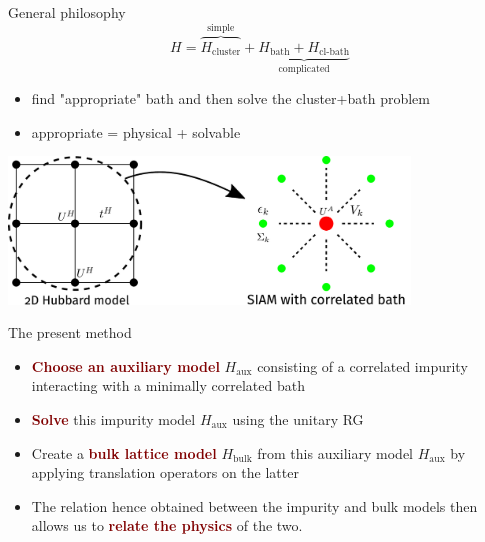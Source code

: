 \documentclass[aspectratio=169]{beamer}
\newcommand{\focus}[1]{\textcolor{maroon}{\textbf{#1}}}
\begin{document}
\begin{frame}[noframenumbering]{General philosophy}
\vspace*{-20pt}
	\[H = \overbrace{H_\text{cluster}}^\text{simple} + \underbrace{H_\text{bath} + H_\text{cl-bath}}_\text{complicated}\]
\begin{itemize}
	\item find "appropriate" bath and then solve the cluster+bath problem
	\item appropriate = physical + solvable
\end{itemize}

\centering
\includegraphics[width=0.8\textwidth]{./figures/cluster-bath.pdf}
\end{frame}

\begin{frame}[noframenumbering]{The present method}
\centering
\begin{itemize}[<+->]
\item \focus{Choose an auxiliary model} \(H_\text{aux}\) consisting of a correlated impurity interacting with a minimally correlated bath
\item \focus{Solve} this impurity model \(H_\text{aux}\) using the unitary RG
\item Create a \focus{bulk lattice model} \(H_\text{bulk}\) from this auxiliary model \(H_\text{aux}\) by applying translation operators on the latter
\item The relation hence obtained between the impurity and bulk models then allows us to \focus{relate the physics} of the two.
\end{itemize}

\end{frame}
\end{document}
